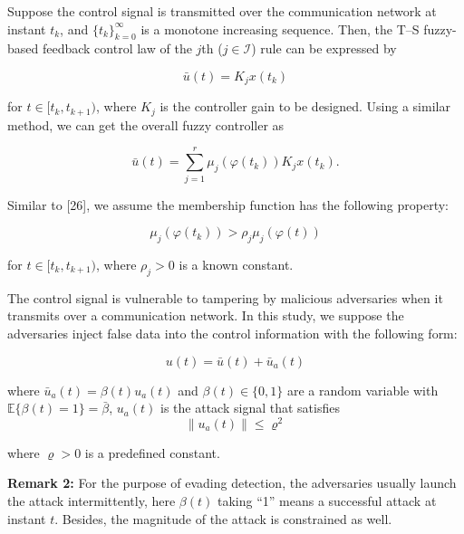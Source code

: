 \documentclass{article}
\begin{document}
Suppose the control signal is transmitted over the communication network at instant $t_k$, and $\{t_k\}_{k=0}^{\infty}$ is a monotone increasing sequence. Then, the T--S fuzzy-based feedback control law of the $j$th ($j \in \mathcal{I}$) rule can be expressed by


\begin{equation}
\bar{u}(t) = K_j x(t_k)
\end{equation}

for $t \in [t_k, t_{k+1})$, where $K_j$ is the controller gain to be designed. Using a similar method, we can get the overall fuzzy controller as

\begin{equation}
\bar{u}(t) = \sum_{j=1}^{r} \mu_j(\varphi(t_k)) K_j x(t_k). 
\end{equation}

Similar to [26], we assume the membership function has the following property:

\begin{equation}
\mu_j(\varphi(t_k)) > \rho_j \mu_j(\varphi(t))
\end{equation}

for $t \in [t_k, t_{k+1})$, where $\rho_j > 0$ is a known constant.

The control signal is vulnerable to tampering by malicious adversaries when it transmits over a communication network. In this study, we suppose the adversaries inject false data into the control information with the following form:

\begin{equation}
u(t) = \bar{u}(t) + \bar{u}_a(t)
\end{equation}

where $\bar{u}_a(t) = \beta(t) u_a(t)$ and $\beta(t) \in \{0, 1\}$ are a random variable with $\mathbb{E}\{\beta(t) = 1\} = \bar{\beta}$, $u_a(t)$ is the attack signal that satisfies
\begin{equation}
\|u_a(t)\| \leq \varrho^2
\end{equation}

where $\varrho > 0$ is a predefined constant.

\textbf{Remark 2:} For the purpose of evading detection, the adversaries usually launch the attack intermittently, here $\beta(t)$ taking ``1'' means a successful attack at instant $t$. Besides, the magnitude of the attack is constrained as well.
\end{document}
